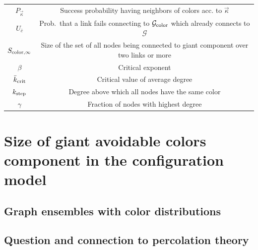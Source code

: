 \documentclass[aps, pre, onecolumn, a4paper, floatfix]{revtex4}
\begin{document}
{\begin{tabular}{ c c }
 $P_{\vec \kappa}$ & Success probability having neighbors of colors acc. to $\vec \kappa$ \\
 $U_{\bar c}$ & Prob.\ that a link fails connecting to ${\mathcal G}_{\rm color}$ which already connects to ${\mathcal G}$ \\
 $S_{{\rm color},\infty}$ & Size of the set of all nodes being connected to giant component over two links or more \\
 \hline
 \hline
 $\beta$ & Critical exponent \\
 ${\bar k}_{\rm crit}$ & Critical value of average degree \\
 $k_{\rm step}$ & Degree above which all nodes have the same color \\
 $\gamma$ & Fraction of nodes with highest degree \\
\end{tabular}

}





\section{Size of giant avoidable colors component in the configuration model}

\subsection{Graph ensembles with color distributions}

\subsection{Question and connection to percolation theory}
\end{document}
